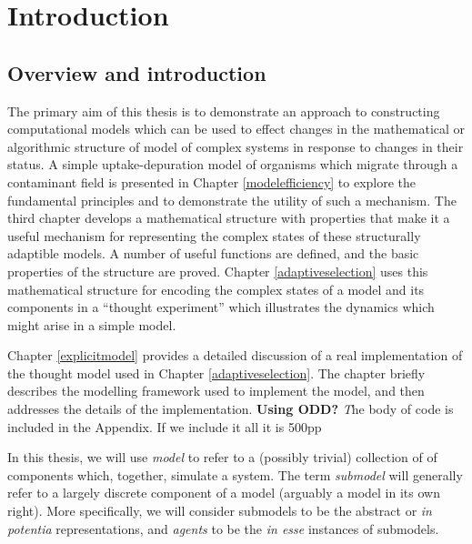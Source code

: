 

\titlepg
\signaturepage
\altcopyrightpage
\abswithesis
\ackpage

\chapter[INTRODUCTION]{Introduction}\label{intro}

\section{Overview and introduction}

The primary aim of this thesis is to demonstrate an approach to
constructing computational models which can be used to effect changes
in the mathematical or algorithmic structure of model of complex
systems in response to changes in their status. A simple
uptake-depuration model of organisms which migrate through a
contaminant field is presented in Chapter \ref{modelefficiency} to
explore the fundamental principles and to demonstrate the utility of
such a mechanism. The third chapter develops a mathematical structure
with properties that make it a useful mechanism for representing the
complex states of these structurally adaptible models. A number of
useful functions are defined, and the basic properties of the
structure are proved. Chapter \ref{adaptiveselection} uses this mathematical
structure for encoding the complex states of a model and its
components in a ``thought experiment'' which illustrates the dynamics
which might arise in a simple model. 

Chapter \ref{explicitmodel} provides a detailed discussion of a real
implementation of the thought model used in Chapter
\ref{adaptiveselection}. The chapter briefly describes the modelling
framework used to implement the model, and then addresses the details
of the implementation. \textbf{Using ODD?} {\emph The body of code is included in
the Appendix.  If we include it all it is 500pp}


In this thesis, we will use \emph{model} to refer to a (possibly
trivial) collection of of components which, together, simulate a
system. The term \emph{submodel} will generally refer to a largely
discrete component of a model (arguably a model in its own right).
More specifically, we will consider submodels to be the abstract or
\emph{in potentia} representations, and \emph{agents} to be the
\emph{in esse} instances of submodels.

